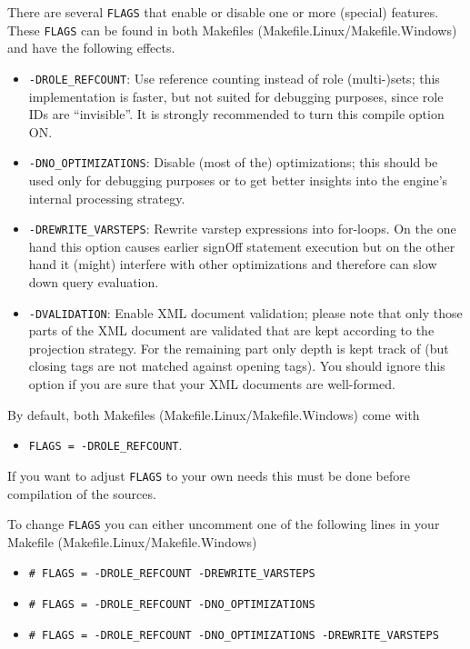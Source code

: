 There are several \texttt{FLAGS} that enable or disable one or more (special) features. These \texttt{FLAGS} can be found in both Makefiles (Makefile.Linux/Makefile.Windows) and have the following effects.
\begin{itemize}
  \setlength{\itemsep}{0pt}
  \item \texttt{-DROLE\_REFCOUNT}: Use reference counting instead of role (multi-)sets; this implementation is faster, but not suited for debugging purposes, since role IDs are \enquote{invisible}. It is strongly recommended to turn this compile option ON.
  \item \texttt{-DNO\_OPTIMIZATIONS}: Disable (most of the) optimizations; this should be used only for debugging purposes or to get better insights into the engine's internal processing strategy.
  \item \texttt{-DREWRITE\_VARSTEPS}: Rewrite varstep expressions into for-loops. On the one hand this option causes earlier signOff statement execution but on the other hand it (might) interfere with other optimizations and therefore can slow down query evaluation.
  \item \texttt{-DVALIDATION}: Enable XML document validation; please note that only those parts of the XML document are validated that are kept according to the projection strategy. For the remaining part only depth is kept track of (but closing tags are not matched against opening tags). You should ignore this option if you are sure that your XML documents are well-formed.
\end{itemize}

\noindent By default, both Makefiles (Makefile.Linux/Makefile.Windows) come with
\begin{itemize}
  \setlength{\itemsep}{0pt}
  \item[] \texttt{FLAGS = -DROLE\_REFCOUNT}.
\end{itemize}

\noindent If you want to adjust \texttt{FLAGS} to your own needs this must be done before compilation of the sources.

\clearpage

\noindent To change \texttt{FLAGS} you can either uncomment one of the following lines in your Makefile (Makefile.Linux/Makefile.Windows)
\begin{itemize}
  \setlength{\itemsep}{0pt}
  \item[] \texttt{\# FLAGS = -DROLE\_REFCOUNT -DREWRITE\_VARSTEPS}
  \item[] \texttt{\# FLAGS = -DROLE\_REFCOUNT -DNO\_OPTIMIZATIONS}
  \item[] \texttt{\# FLAGS = -DROLE\_REFCOUNT -DNO\_OPTIMIZATIONS -DREWRITE\_VARSTEPS}
\end{itemize}


